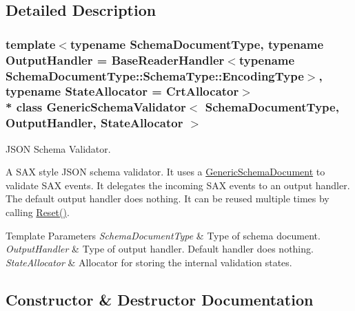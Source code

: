 \subsection{Detailed Description}
\subsubsection*{template$<$typename Schema\+Document\+Type, typename Output\+Handler = Base\+Reader\+Handler$<$typename Schema\+Document\+Type\+::\+Schema\+Type\+::\+Encoding\+Type$>$, typename State\+Allocator = Crt\+Allocator$>$\\*
class Generic\+Schema\+Validator$<$ Schema\+Document\+Type, Output\+Handler, State\+Allocator $>$}

J\+S\+ON Schema Validator. 

A S\+AX style J\+S\+ON schema validator. It uses a {\ttfamily \hyperlink{class_generic_schema_document}{Generic\+Schema\+Document}} to validate S\+AX events. It delegates the incoming S\+AX events to an output handler. The default output handler does nothing. It can be reused multiple times by calling {\ttfamily \hyperlink{class_generic_schema_validator_a49efbbe098cb77728be3d48cafed17e4}{Reset()}}.


\begin{DoxyTemplParams}{Template Parameters}
{\em Schema\+Document\+Type} & Type of schema document. \\
\hline
{\em Output\+Handler} & Type of output handler. Default handler does nothing. \\
\hline
{\em State\+Allocator} & Allocator for storing the internal validation states. \\
\hline
\end{DoxyTemplParams}


\subsection{Constructor \& Destructor Documentation}
